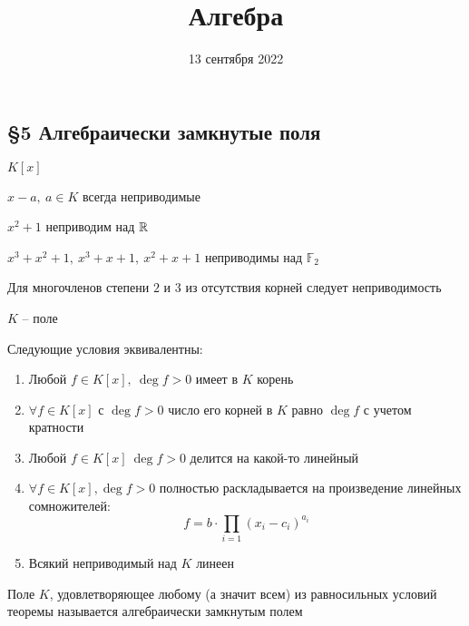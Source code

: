 


    \title{Алгебра}
    \date{13 сентября 2022}
    \maketitle

    \pagebreak

    \subsection*{\S5 Алгебраически замкнутые поля}

    \par $K[x]$
    \par $x - a, \ a \in K$ всегда неприводимые

    \begin{illustration*}
        $x^2 + 1$ неприводим над $\mathbb{R}$
        \par \quad $x^3 + x^2 + 1, \ x^3 + x + 1, \ x^2 + x + 1$ неприводимы над $\mathbb{F}_2$
    \end{illustration*}

    \par Для многочленов степени $2$ и $3$ из отсутствия корней следует неприводимость

    \begin{theorem*}
        $K$ -- поле
        \par \quad Следующие условия эквивалентны:
        \begin{enumerate}
            \item Любой $f \in K[x], \ \deg f > 0$ имеет в $K$ корень
            \item $\forall f \in K[x]$ с $\deg f > 0$ число его корней в $K$ равно $\deg f$ с учетом кратности
            \item Любой $f \in K[x] \ \deg f > 0$ делится на какой-то линейный
            \item $\forall f \in K[x], \deg f > 0$ полностью раскладывается на произведение линейных сомножителей:
                \[
                    f = b \cdot \prod_{i = 1} (x_i- c_i)^{a_i}    
                \]
            \item Всякий неприводимый над $K$ линеен
        \end{enumerate}
    \end{theorem*}

    \begin{definition}
        Поле $K$, удовлетворяющее любому (а значит всем) из равносильных условий теоремы называется алгебраически замкнутым полем
    \end{definition}

